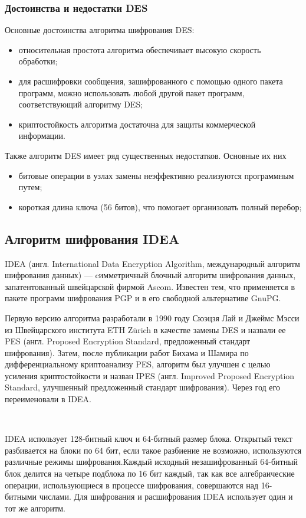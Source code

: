 \documentclass[a4paper]{report}
\begin{document}
\subsubsection{Достоинства и недостатки DES}
Основные достоинства алгоритма шифрования DES:
\begin{itemize}
\item относительная простота алгоритма обеспечивает высокую скорость\\ обработки;
\item для расшифровки сообщения, зашифрованного с помощью одного пакета программ, можно использовать любой другой пакет программ, соответствующий алгоритму DES;
\item криптостойкость алгоритма достаточна для защиты коммерческой \\ информации.
\end{itemize}

Также алгоритм DES имеет ряд существенных недостатков. Основные их них 
\begin{itemize}
\item битовые операции в узлах замены неэффективно реализуются программ­ным путем;
\item  короткая длина ключа (56 битов), что помогает организо­вать полный перебор;
\end{itemize}

\subsection{Алгоритм шифрования IDEA}
IDEA (англ. International Data Encryption Algorithm, международный алгоритм шифрования данных) — cимметричный блочный алгоритм шифрования данных, запатентованный швейцарской фирмой Ascom. Известен тем, что применяется в пакете программ шифрования PGP и в его свободной альтернативе GnuPG.

Первую версию алгоритма разработали в 1990 году Сюэцзя Лай и Джеймс Мэсси из Швейцарского института ETH Zürich в качестве замены DES и назвали ее PES (англ. Proposed Encryption Standard, предложенный стандарт шифрования). Затем, после публикации работ Бихама и Шамира по дифференциальному криптоанализу PES, алгоритм был улучшен с целью усиления криптостойкости и назван IPES (англ. Improved Proposed Encryption Standard, улучшенный предложенный стандарт шифрования). Через год его переименовали в IDEA.

~

IDEA использует 128-битный ключ и 64-битный размер блока. Открытый текст разбивается на блоки по 64 бит, если такое разбиение не возможно, используются различные режимы шифрования.Каждый исходный незашифрованный 64-битный блок делится на четыре подблока по 16 бит каждый, так как все алгебраические операции, использующиеся в процессе шифрования, совершаются над 16-битными числами. Для шифрования и расшифрования IDEA использует один и тот же алгоритм.
\end{document}
